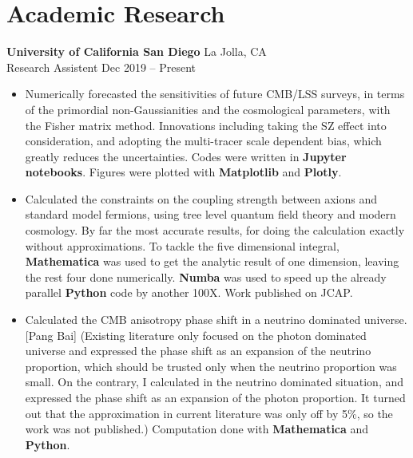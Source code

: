 \documentclass[letterpaper,12pt]{article}
\newenvironment{zitemize}{
\begin{itemize} \vspace{-.9em}\itemsep 0pt \parskip 0pt}
{\end{itemize}\vspace{-.5em}}
\newcommand{\narratage}[1]{{\color{blue} [Pang Bai] #1}}
\newcommand{\proglang}[1]{\textbf{#1}}
\begin{document}
\section{Academic Research}
\textbf{University of California San Diego} \hfill La Jolla, CA \\
Research Assistent \hfill Dec 2019 -- Present \\
\begin{zitemize}
    \item Numerically forecasted the sensitivities of future CMB/LSS surveys, in terms of the primordial non-Gaussianities and the cosmological parameters, with the Fisher matrix method. Innovations including taking the SZ effect into consideration, and adopting the multi-tracer scale dependent bias, which greatly reduces the uncertainties. Codes were written in \proglang{Jupyter notebooks}. Figures were plotted with \proglang{Matplotlib} and \proglang{Plotly}.
    \item Calculated the constraints on the coupling strength between axions and standard model fermions, using tree level quantum field theory and modern cosmology. By far the most accurate results, for doing the calculation exactly without approximations. To tackle the five dimensional integral, \proglang{Mathematica} was used to get the analytic result of one dimension, leaving the rest four done numerically. \proglang{Numba} was used to speed up the already parallel \proglang{Python} code by another 100X. Work published on JCAP.
    \item Calculated the CMB anisotropy phase shift in a neutrino dominated universe. \narratage{(Existing literature only focused on the photon dominated universe and expressed the phase shift as an expansion of the neutrino proportion, which should be trusted only when the neutrino proportion was small. On the contrary, I calculated in the neutrino dominated situation, and expressed the phase shift as an expansion of the photon proportion. It turned out that the approximation in current literature was only off by 5\%, so the work was not published.)} Computation done with \proglang{Mathematica} and \proglang{Python}.
\end{zitemize}
\end{document}
